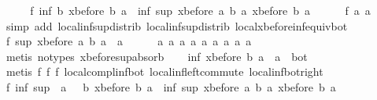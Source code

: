 \begin{isabellebody}
\ \ \isamarkupfalse%
\ \isamarkupfalse%
\ f{}{}{\isacharcolon}\ {\isachardoublequoteopen}inf\ b\ {\isacharparenleft}xbefore\ b\ a{\isacharparenright}\ {\isacharequal}\ inf\ {\isacharparenleft}sup\ {\isacharparenleft}xbefore\ a\ b{\isacharparenright}\ a{\isacharparenright}\ {\isacharparenleft}xbefore\ b\ a{\isacharparenright}{\isachardoublequoteclose}\isanewline
\ \ \ \ \isamarkupfalse%
\ f{}{}\ a{}\ a{}\ \isamarkupfalse%
\ {\isacharparenleft}simp\ add{\isacharcolon}\ local{\isachardot}inf{\isacharunderscore}sup{\isacharunderscore}distrib{}\ local{\isachardot}inf{\isacharunderscore}sup{\isacharunderscore}distrib{}\ local{\isachardot}xbefore{\isacharunderscore}inf{\isacharunderscore}equiv{\isacharunderscore}bot{\isacharparenright}\isanewline
\ \ \isamarkupfalse%
\ f{}{}{\isacharcolon}\ {\isachardoublequoteopen}sup\ {\isacharparenleft}xbefore\ a\ b{\isacharparenright}\ a\ {\isacharequal}\ a{\isachardoublequoteclose}\isanewline
\ \ \ \ \isamarkupfalse%
\ a{}\ a{}\ a{}\ a{}\ a{}\ a{}\ a{}\ a{}\ a{}\ \isamarkupfalse%
\ {\isacharparenleft}metis\ {\isacharparenleft}no{\isacharunderscore}types{\isacharparenright}\ xbefore{\isacharunderscore}sup{\isacharunderscore}absorb{\isacharunderscore}{}{\isacharparenright}\isanewline
\ \ \isamarkupfalse%
\ {\isachardoublequoteopen}inf\ {\isacharparenleft}xbefore\ b\ a{\isacharparenright}\ {\isacharparenleft}{\isacharminus}\ a{\isacharparenright}\ {\isacharequal}\ bot{\isachardoublequoteclose}\isanewline
\ \ \ \ \isamarkupfalse%
\ {\isacharparenleft}metis\ f{}{}\ f{}{}\ f{}{}\ local{\isachardot}compl{\isacharunderscore}inf{\isacharunderscore}bot\ local{\isachardot}inf{\isachardot}left{\isacharunderscore}commute\ local{\isachardot}inf{\isacharunderscore}bot{\isacharunderscore}right{\isacharparenright}\isanewline
\ \ \isamarkupfalse%
\ \isamarkupfalse%
\ f{}{}{\isacharcolon}\ {\isachardoublequoteopen}inf\ {\isacharparenleft}sup\ {\isacharparenleft}{\isacharminus}\ a{\isacharparenright}\ {\isacharparenleft}{\isacharminus}\ {\isacharparenleft}{\isacharminus}\ b{\isacharparenright}{\isacharparenright}{\isacharparenright}\ {\isacharparenleft}xbefore\ b\ a{\isacharparenright}\ {\isacharequal}\ inf\ {\isacharparenleft}sup\ {\isacharparenleft}xbefore\ a\ b{\isacharparenright}\ a{\isacharparenright}\ {\isacharparenleft}xbefore\ b\ a{\isacharparenright}{\isachardoublequoteclose}\isanewline

\end{isabellebody}
